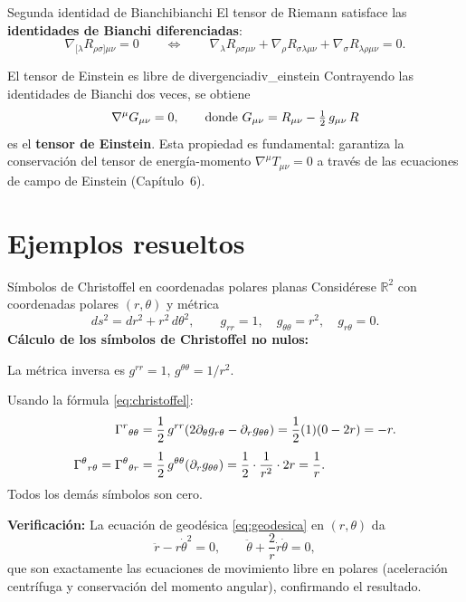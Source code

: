 \begin{teorema}{Segunda identidad de Bianchi}{bianchi}
El tensor de Riemann satisface las \textbf{identidades de Bianchi diferenciadas}:
\begin{equation}
  \nabla_{[\lambda} R_{\rho\sigma]\mu\nu} = 0
  \qquad \Longleftrightarrow \qquad
  \nabla_\lambda R_{\rho\sigma\mu\nu}
  + \nabla_\rho R_{\sigma\lambda\mu\nu}
  + \nabla_\sigma R_{\lambda\rho\mu\nu} = 0.
  \label{eq:bianchi2}
\end{equation}
\end{teorema}

\begin{corolario}{El tensor de Einstein es libre de divergencia}{div_einstein}
Contrayendo las identidades de Bianchi dos veces, se obtiene
\begin{equation}
  \nabla^\mu G_{\mu\nu} = 0, \qquad
  \text{donde } G_{\mu\nu} = R_{\mu\nu} - \tfrac{1}{2}\, g_{\mu\nu}\, R
  \label{eq:div_einstein}
\end{equation}
es el \textbf{tensor de Einstein}. Esta propiedad es fundamental: garantiza la conservación del tensor de energía-momento $\nabla^\mu T_{\mu\nu}=0$ a través de las ecuaciones de campo de Einstein (Capítulo~6).
\end{corolario}

\section{Ejemplos resueltos}

\begin{ejemplo}{Símbolos de Christoffel en coordenadas polares planas}{}
Considérese $\mathbb{R}^2$ con coordenadas polares $(r,\theta)$ y métrica
\[
  ds^2 = dr^2 + r^2\, d\theta^2, \qquad
  g_{rr} = 1,\quad g_{\theta\theta} = r^2,\quad g_{r\theta} = 0.
\]
\textbf{Cálculo de los símbolos de Christoffel no nulos:}

La métrica inversa es $g^{rr} = 1$, $g^{\theta\theta} = 1/r^2$.

Usando la fórmula \eqref{eq:christoffel}:
\begin{align*}
  \Gamma^{r}{}_{\theta \theta}
  &= \frac{1}{2}\, g^{rr}(2\partial_\theta g_{r\theta} - \partial_r g_{\theta\theta})
  = \frac{1}{2}(1)(0 - 2r) = -r.
  \\[4pt]
  \Gamma^{\theta}{}_{r \theta}
  = \Gamma^{\theta}{}_{\theta r}
  &= \frac{1}{2}\, g^{\theta\theta}(\partial_r g_{\theta\theta})
  = \frac{1}{2}\cdot\frac{1}{r^2}\cdot 2r = \frac{1}{r}.
\end{align*}
Todos los demás símbolos son cero.

\textbf{Verificación:} La ecuación de geodésica \eqref{eq:geodesica} en $(r,\theta)$ da
\[
  \ddot{r} - r\dot{\theta}^2 = 0, \qquad \ddot{\theta} + \frac{2}{r}\dot{r}\dot{\theta} = 0,
\]
que son exactamente las ecuaciones de movimiento libre en polares (aceleración centrífuga y conservación del momento angular), confirmando el resultado.
\end{ejemplo}

